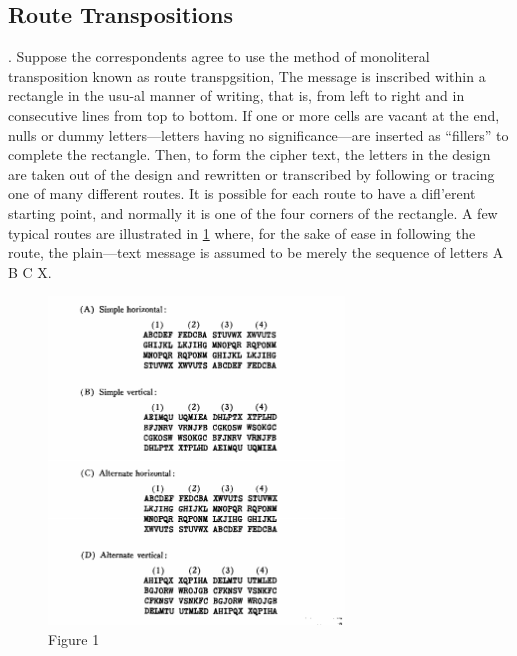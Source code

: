 \subsection{Route Transpositions}

\mypara. Suppose the correspondents agree to use the method of monoliteral
transposition known as route transpgsition, The message is inscribed 
within a rectangle in the usu-al manner of writing, that is, from left to
right and in consecutive lines from top to bottom. If one or more cells
are vacant at the end, nulls or dummy letters—letters having no significance—are inserted as “fillers” to complete the rectangle. Then, to form
the cipher text, the letters in the design are taken out of the design and
rewritten or transcribed by following or tracing one of many different
routes. It is possible for each route to have a diﬂ’erent starting point, and
normally it is one of the four corners of the rectangle. A few typical
routes are illustrated in \ref{fig:Figure1} where, for the sake of ease in following
the route, the plain—text message is assumed to be merely the sequence
of letters A B C X.

\begin{figure}[h]
  \centering
    \includegraphics[width=0.7\textwidth,natwidth=598,natheight=663]{Chapter2_fig1.png}
    \caption{Figure 1}
    \label{fig:Figure1}
\end{figure}

